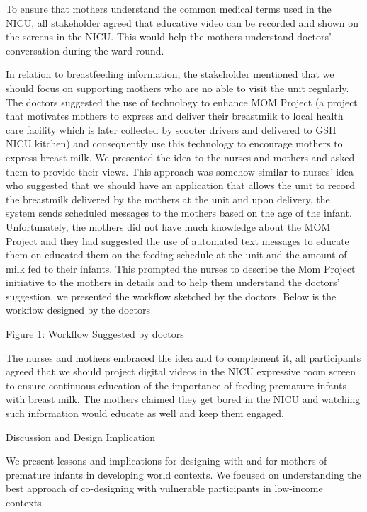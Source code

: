 To ensure that mothers understand the common medical terms used in the NICU, all stakeholder agreed that educative video can be recorded and shown on the screens in the NICU. This would help the mothers understand doctors’ conversation during the ward round.

In relation to breastfeeding information, the stakeholder mentioned that we should focus on supporting mothers who are no able to visit the unit regularly. The doctors suggested the use of technology to enhance MOM Project (a project that motivates mothers to express and deliver their breastmilk to local health care facility which is later collected by scooter drivers and delivered to GSH NICU kitchen) and consequently use this technology to encourage mothers to express breast milk. We presented the idea to the nurses and mothers and asked them to provide their views.
 This approach was somehow similar to nurses’ idea who suggested that we should have an application that allows the unit to record the breastmilk delivered by the mothers at the unit and upon delivery, the system sends scheduled messages to the mothers based on the age of the infant. Unfortunately, the mothers did not have much knowledge about the MOM Project and they had suggested the use of automated text messages to educate them on educated them on the feeding schedule at the unit and the amount of milk fed to their infants. This prompted the nurses to describe the Mom Project initiative to the mothers in details and to help them understand the doctors’ suggestion, we presented the workflow sketched by the doctors. Below is the workflow designed by the doctors

Figure 1: Workflow Suggested by doctors

The nurses and mothers embraced the idea and to complement it, all participants agreed that we should project digital videos in the NICU expressive room screen to ensure continuous education of the importance of feeding premature infants with breast milk. The mothers claimed they get bored in the NICU and watching such information would educate as well and keep them engaged.

Discussion and Design Implication

﻿We present lessons and implications for designing with and for mothers of premature infants in developing world contexts.  We focused on understanding the best approach of co-designing with vulnerable participants in low-income contexts.

